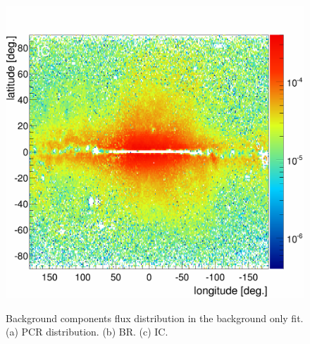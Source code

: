 \begin{figure}[H]
\begin{minipage}[h]{0.45\textwidth}
  	\subcaption{}
  	\label{app:BKGonly_BR}
  \end{minipage}
  \hfill
  \begin{minipage}[h]{0.45\textwidth}
  	\centering
	\includegraphics[width=1\linewidth]{pic/results/BKG_IC_Integral.png}
 	\subcaption{}
  	\label{app:BKGonly_IC}
  \end{minipage}
  \caption[Background components flux distribution in the background only fit]{Background components flux distribution in the background only fit. (a) PCR distribution. (b) BR. (c) IC.}
  \label{app:BKGonly_fit_distributions}
\end{figure}
 

